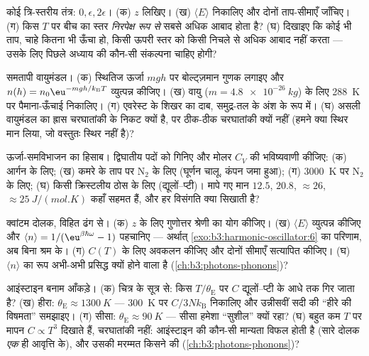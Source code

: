 \begin{exercise}[$\star$]\label{exo:b3:canonical-ensemble:2}
कोई त्रि-स्तरीय तंत्र: $0, \epsilon, 2\epsilon$। (क) $z$ लिखिए। (ख)
$\langle E\rangle$ निकालिए और दोनों ताप-सीमाएँ जाँचिए। (ग)
किस $T$ पर बीच का स्तर \emph{निरपेक्ष रूप से} सबसे अधिक आबाद होता है?
(घ) दिखाइए कि कोई भी ताप, चाहे कितना भी ऊँचा हो, किसी ऊपरी स्तर को
किसी निचले से अधिक आबाद नहीं करता --- उसके लिए पिछले अध्याय की
कौन-सी संकल्पना चाहिए होगी?
\end{exercise}

\begin{exercise}[$\star$]\label{exo:b3:canonical-ensemble:3}
समतापी वायुमंडल। (क) स्थितिज ऊर्जा
$mgh$ पर बोल्ट्ज़मान गुणक लगाइए और $n(h) = n_0\eu^{-mgh/k_{\text{B}}
T}$ व्युत्पन्न कीजिए। (ख) वायु ($m = \qty{4.8e-26}{kg}$) के लिए
\qty{288}{K} पर पैमाना-ऊँचाई निकालिए। (ग) एवरेस्ट के शिखर का दाब,
समुद्र-तल के अंश के रूप में। (घ) असली वायुमंडल का ह्रास चरघातांकी के
निकट क्यों है, पर ठीक-ठीक चरघातांकी क्यों नहीं (हमने क्या स्थिर मान
लिया, जो वस्तुतः स्थिर नहीं है)?
\end{exercise}

\begin{exercise}[$\star$]\label{exo:b3:canonical-ensemble:4}
ऊर्जा-समविभाजन का हिसाब। द्विघातीय पदों को गिनिए और मोलर $C_V$ की
भविष्यवाणी कीजिए: (क) आर्गन के लिए; (ख) कमरे के ताप पर N$_2$ के लिए
(घूर्णन चालू, कंपन जमा हुआ); (ग) \qty{3000}{K} पर N$_2$ के लिए; (घ)
किसी क्रिस्टलीय ठोस के लिए (द्यूलों--प्टी)। मापे गए मान
$12.5$, $20.8$, $\approx26$, $\approx\qty{25}{J/(mol.K)}$ कहाँ सहमत
हैं, और हर विसंगति क्या सिखाती है?
\end{exercise}

\begin{exercise}[$\star\star$]\label{exo:b3:canonical-ensemble:5}
क्वांटम दोलक, विहित ढंग से। (क) $z$ के लिए गुणोत्तर श्रेणी का योग
कीजिए। (ख) $\langle E\rangle$ व्युत्पन्न कीजिए और $\langle
n\rangle = 1/(\eu^{\beta\hbar\omega} - 1)$ पहचानिए --- अर्थात्
\cref{exo:b3:harmonic-oscillator:6} का परिणाम, अब बिना श्रम के। (ग)
$C(T)$ के लिए अवकलन कीजिए और दोनों सीमाएँ सत्यापित कीजिए। (घ)
$\langle n\rangle$ का रूप अभी-अभी प्रसिद्ध क्यों होने वाला है
(\cref{ch:b3:photons-phonons})?
\end{exercise}

\begin{exercise}[$\star\star$]\label{exo:b3:canonical-ensemble:6}
आइंस्टाइन बनाम आँकड़े। (क) चित्र के सूत्र से: किस
$T/\theta_{\text{E}}$ पर $C$ द्यूलों--प्टी के आधे तक गिर जाता है? (ख)
हीरा: $\theta_{\text{E}} \approx \qty{1300}{K}$ --- \qty{300}{K} पर
$C/3Nk_{\text{B}}$ निकालिए और उन्नीसवीं सदी की ``हीरे की विषमता''
समझाइए। (ग) सीसा: $\theta_{\text{E}}
\approx \qty{90}{K}$ --- सीसा हमेशा ``सुशील'' क्यों रहा? (घ)
बहुत कम $T$ पर मापन $C \propto T^3$ दिखाते हैं, चरघातांकी नहीं:
आइंस्टाइन की कौन-सी मान्यता विफल होती है (सारे दोलक \emph{एक} ही
आवृत्ति के), और उसकी मरम्मत किसने की
(\cref{ch:b3:photons-phonons})?
\end{exercise}

